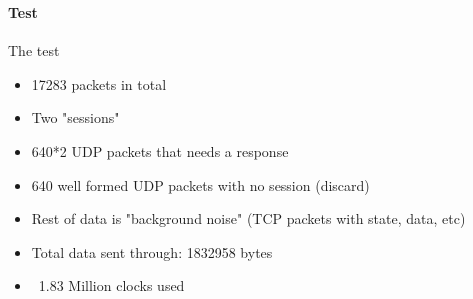 \begin{frame}%
    \frametitle{\EvaluationTitle}
    \framesubtitle{Test}
    The test
    \begin{itemize}%
        \item 17283 packets in total
        \item Two "sessions"
        \item 640*2 UDP packets that needs a response
        \item 640 well formed UDP packets with no session (discard)
        \item Rest of data is "background noise" (TCP packets with state, data, etc)
        \item Total data sent through: 1832958 bytes
        \item ~1.83 Million clocks used
    \end{itemize}
\end{frame}

